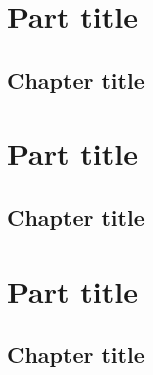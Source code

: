 \documentclass[version]{thesis-ucl}
\begin{document}
    \part{Part title \label{part:partLabel2}}
        \chapter{Chapter title \label{chap:chapterLabel2}}
            \lipsum
        
    \part{Part title \label{part:partLabel3}}
        \chapter{Chapter title \label{chap:chapterLabel3}}
            \lipsum
    
    \appendix
    \part{Part title \label{part:partLabel4}}
        \chapter{Chapter title \label{chap:chapterLabel4}}
            \lipsum
        
    
    \cleardoublepage
    
    \renewcommand{\bibname}{References}
    
    
    \cleardoublepage
    \printindex
\end{document}
